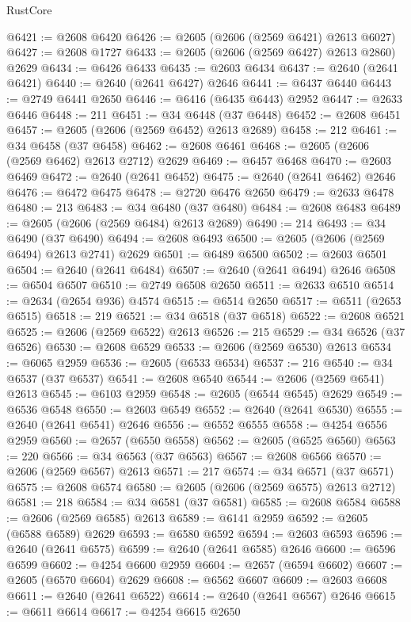 \begin{lexlean}{RustCore}
\begin{coremodule}
@6421 := @2608 @6420
@6426 := @2605 (@2606 (@2569 @6421) @2613 @6027)
@6427 := @2608 @1727
@6433 := @2605 (@2606 (@2569 @6427) @2613 @2860) @2629
@6434 := @6426 @6433
@6435 := @2603 @6434
@6437 := @2640 (@2641 @6421)
@6440 := @2640 (@2641 @6427) @2646
@6441 := @6437 @6440
@6443 := @2749 @6441 @2650
@6446 := @6416 (@6435 @6443) @2952
@6447 := @2633 @6446
@6448 := 211
@6451 := @34 @6448 (@37 @6448)
@6452 := @2608 @6451
@6457 := @2605 (@2606 (@2569 @6452) @2613 @2689)
@6458 := 212
@6461 := @34 @6458 (@37 @6458)
@6462 := @2608 @6461
@6468 := @2605 (@2606 (@2569 @6462) @2613 @2712) @2629
@6469 := @6457 @6468
@6470 := @2603 @6469
@6472 := @2640 (@2641 @6452)
@6475 := @2640 (@2641 @6462) @2646
@6476 := @6472 @6475
@6478 := @2720 @6476 @2650
@6479 := @2633 @6478
@6480 := 213
@6483 := @34 @6480 (@37 @6480)
@6484 := @2608 @6483
@6489 := @2605 (@2606 (@2569 @6484) @2613 @2689)
@6490 := 214
@6493 := @34 @6490 (@37 @6490)
@6494 := @2608 @6493
@6500 := @2605 (@2606 (@2569 @6494) @2613 @2741) @2629
@6501 := @6489 @6500
@6502 := @2603 @6501
@6504 := @2640 (@2641 @6484)
@6507 := @2640 (@2641 @6494) @2646
@6508 := @6504 @6507
@6510 := @2749 @6508 @2650
@6511 := @2633 @6510
@6514 := @2634 (@2654 @936) @4574
@6515 := @6514 @2650
@6517 := @6511 (@2653 @6515)
@6518 := 219
@6521 := @34 @6518 (@37 @6518)
@6522 := @2608 @6521
@6525 := @2606 (@2569 @6522) @2613
@6526 := 215
@6529 := @34 @6526 (@37 @6526)
@6530 := @2608 @6529
@6533 := @2606 (@2569 @6530) @2613
@6534 := @6065 @2959
@6536 := @2605 (@6533 @6534)
@6537 := 216
@6540 := @34 @6537 (@37 @6537)
@6541 := @2608 @6540
@6544 := @2606 (@2569 @6541) @2613
@6545 := @6103 @2959
@6548 := @2605 (@6544 @6545) @2629
@6549 := @6536 @6548
@6550 := @2603 @6549
@6552 := @2640 (@2641 @6530)
@6555 := @2640 (@2641 @6541) @2646
@6556 := @6552 @6555
@6558 := @4254 @6556 @2959
@6560 := @2657 (@6550 @6558)
@6562 := @2605 (@6525 @6560)
@6563 := 220
@6566 := @34 @6563 (@37 @6563)
@6567 := @2608 @6566
@6570 := @2606 (@2569 @6567) @2613
@6571 := 217
@6574 := @34 @6571 (@37 @6571)
@6575 := @2608 @6574
@6580 := @2605 (@2606 (@2569 @6575) @2613 @2712)
@6581 := 218
@6584 := @34 @6581 (@37 @6581)
@6585 := @2608 @6584
@6588 := @2606 (@2569 @6585) @2613
@6589 := @6141 @2959
@6592 := @2605 (@6588 @6589) @2629
@6593 := @6580 @6592
@6594 := @2603 @6593
@6596 := @2640 (@2641 @6575)
@6599 := @2640 (@2641 @6585) @2646
@6600 := @6596 @6599
@6602 := @4254 @6600 @2959
@6604 := @2657 (@6594 @6602)
@6607 := @2605 (@6570 @6604) @2629
@6608 := @6562 @6607
@6609 := @2603 @6608
@6611 := @2640 (@2641 @6522)
@6614 := @2640 (@2641 @6567) @2646
@6615 := @6611 @6614
@6617 := @4254 @6615 @2650

\end{coremodule}
\end{lexlean}
